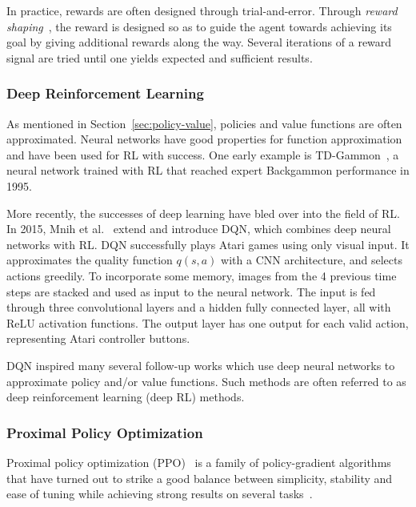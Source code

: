 In practice, rewards are often designed through trial-and-error.
Through \textit{reward shaping}~\cite{mataric_reward_1994},
the reward is designed so as to guide the agent towards achieving its goal by giving additional rewards along the way.
Several iterations of a reward signal are tried until one yields expected and sufficient results.

\subsubsection{Deep Reinforcement Learning}

As mentioned in Section~\ref{sec:policy-value}, policies and value functions are often approximated.
Neural networks have good properties for function approximation and have been used for RL with success.
One early example is TD-Gammon~\cite{tesauro_temporal_1995}, a neural network trained with RL that reached expert Backgammon performance in 1995.

More recently, the successes of deep learning have bled over into the field of RL.
In 2015, Mnih et al.~\cite{mnih_human-level_2015} extend \cite{mnih_playing_2013} and introduce DQN, which combines deep neural networks with RL.
DQN successfully plays Atari games using only visual input.
It approximates the quality function \(q(s, a)\) with a CNN architecture, and selects actions greedily.
To incorporate some memory, images from the 4 previous time steps are stacked and used as input to the neural network.
The input is fed through three convolutional layers and a hidden fully connected layer, all with ReLU activation functions.
The output layer has one output for each valid action, representing Atari controller buttons.

DQN inspired many several follow-up works which use deep neural networks to approximate policy and/or value functions.
Such methods are often referred to as deep reinforcement learning (deep RL) methods.

\subsubsection{Proximal Policy Optimization}
\label{sec:ppo}

Proximal policy optimization (PPO)~\cite{schulman_proximal_2017} is a family of policy-gradient algorithms that have turned out to strike a good balance between simplicity, stability and ease of tuning while achieving strong results on several tasks~\cite{schulman_proximal_2017,henderson_deep_2018,cobbe_leveraging_2020,vinyals_grandmaster_2019,andrychowicz_what_2020}.

